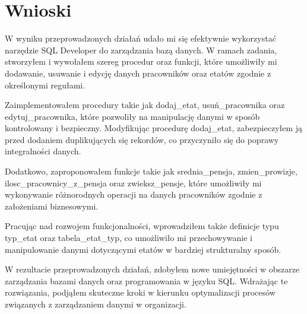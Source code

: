 \documentclass{article}
\begin{document}
\section{Wnioski}

W wyniku przeprowadzonych działań udało mi się efektywnie wykorzystać narzędzie SQL Developer do zarządzania bazą danych. W ramach zadania, stworzyłem i wywołałem szereg procedur oraz funkcji, które umożliwiły mi dodawanie, usuwanie i edycję danych pracowników oraz etatów zgodnie z określonymi regułami.

Zaimplementowałem procedury takie jak dodaj\_etat, usuń\_pracownika oraz edytuj\_pracownika, które pozwoliły na manipulację danymi w sposób kontrolowany i bezpieczny. Modyfikując procedurę dodaj\_etat, zabezpieczyłem ją przed dodaniem duplikujących się rekordów, co przyczyniło się do poprawy integralności danych.

Dodatkowo, zaproponowałem funkcje takie jak srednia\_pensja, zmien\_prowizje, ilosc\_pracownicy\_z\_pensja oraz zwieksz\_pensje, które umożliwiły mi wykonywanie różnorodnych operacji na danych pracowników zgodnie z założeniami biznesowymi.

Pracując nad rozwojem funkcjonalności, wprowadziłem także definicje typu typ\_etat oraz tabela\_etat\_typ, co umożliwiło mi przechowywanie i manipulowanie danymi dotyczącymi etatów w bardziej strukturalny sposób.

W rezultacie przeprowadzonych działań, zdobyłem nowe umiejętności w obszarze zarządzania bazami danych oraz programowania w języku SQL. Wdrażając te rozwiązania, podjąłem skuteczne kroki w kierunku optymalizacji procesów związanych z zarządzaniem danymi w organizacji.
\end{document}
